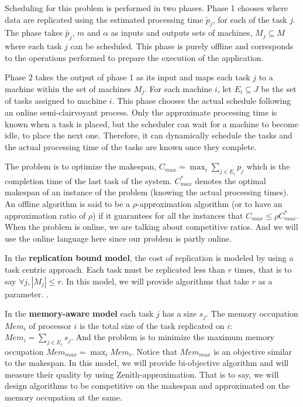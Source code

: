 \documentclass[twocolumn]{svjour3}
\begin{document}
Scheduling for this problem is performed in two phases. Phase 1
chooses where data are replicated using the estimated processing time
$\tilde p_j $, for each of the task $j$. The phase takes
$\tilde{p_j}$, $m$ and $\alpha$ as inputs and outputs sets of
machines, $M_j \subseteq M $ where each task $j$ can be
scheduled. This phase is purely offline and corresponds to the
operations performed to prepare the execution of the application.

Phase 2 takes the output of phase 1 as its input and maps each task
$j$ to a machine within the set of machines $M_j$. For each machine
$i$, let $E_i \subseteq J$ be the set of tasks assigned to machine
$i$. This phase chooses the actual schedule following an online
semi-clairvoyant process. Only the approximate processing time is
known when a task is placed, but the scheduler can wait for a machine
to become idle, to place the next one. Therefore, it can dynamically
schedule the tasks and the actual processing time of the tasks are
known once they complete.

The problem is to optimize the makespan, $C_{max} = \max_i \sum_{j \in
  E_i} p_j$ which is the completion time of the last task of the
system. $C_{max}^{*}$ denotes the optimal makespan of an instance of
the problem (knowing the actual processing times). An offline
algorithm is said to be a $\rho$-approximation algorithm (or to have
an approximation ratio of $\rho$) if it guarantees for all the
instances that $C_{max} \leq \rho C_{max}^*$. When the problem is
online, we are talking about competitive ratios. And we will use the
online language here since our problem is partly online.

In the {\bf replication bound model}, the cost of replication is
modeled by using a task centric approach. Each task must be replicated
less than $r$ times, that is to say $\forall j, | M_j | \leq r$. In
this model, we will provide algorithms that take $r$ as a parameter. .

In the {\bf memory-aware model} each task $j$ has a size $s_j$. The
memory occupation $Mem_i$ of processor $i$ is the total size of the
task replicated on $i$: $Mem_i = \sum_{j \in E_i} s_j$. And the
problem is to minimize the maximum memory occupation $Mem_{max} =
\max_i Mem_i$. Notice that $Mem_{max}$ is an objective similar to the
makespan. In this model, we will provide bi-objective algorithm and
will measure their quality by using Zenith-approximation. That is to
say, we will design algorithms to be competitive on the makespan and
approximated on the memory occupation at the same.
\end{document}
